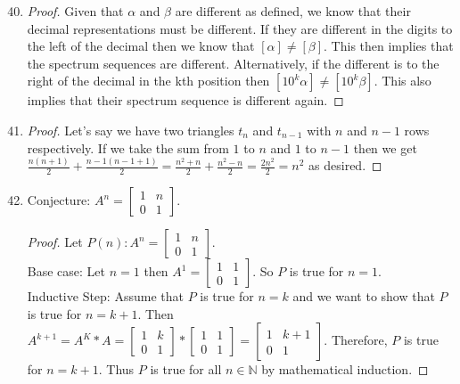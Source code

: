 \documentclass{article}
\begin{document}
\begin{enumerate}
    \setcounter{enumi}{39}
    \item
    
    \begin{proof}
    Given that $\alpha$ and $\beta$ are different as defined, we know that their decimal representations must be different. If they are different in the digits to the left of the decimal then we know that $[\alpha]\neq[\beta]$. This then implies that the spectrum sequences are different. Alternatively, if the different is to the right of the decimal in the kth position then $[10^k\alpha]\neq[10^k\beta]$. This also implies that their spectrum sequence is different again.
    \end{proof}
    
    \setcounter{enumi}{5}
    \item
    
    \begin{proof}
    Let's say we have two triangles $t_n$ and $t_{n-1}$ with $n$ and $n-1$ rows respectively. If we take the sum from $1$ to $n$ and $1$ to $n-1$ then we get $\frac{n(n+1)}{2} + \frac{n-1(n-1+1)}{2} = \frac{n^2+n}{2} + \frac{n^2-n}{2} = \frac{2n^2}{2} = n^2$ as desired.
    \end{proof}
    
    \setcounter{enumi}{4}
    \item
    
    Conjecture: $A^n = \begin{bmatrix}
    1 & n \\
    0 & 1
    \end{bmatrix}$.
    \begin{proof}
    Let $P(n): A^n = \begin{bmatrix}
    1 & n \\
    0 & 1
    \end{bmatrix}.$\\
    Base case: Let $n=1$ then $A^1 = \begin{bmatrix}
    1 &  1\\
    0 & 1
    \end{bmatrix}$. So $P$ is true for $n=1.$\\
    Inductive Step: Assume that $P$ is true for $n=k$ and we want to show that $P$ is true for $n=k+1.$ Then $A^{k+1} = A^K *A = \begin{bmatrix}
    1 &  k\\
    0 & 1
    \end{bmatrix} * \begin{bmatrix}
    1 &  1\\
    0 & 1
    \end{bmatrix} = \begin{bmatrix}
    1 &  k+1\\
    0 & 1
    \end{bmatrix}$. Therefore, $P$ is true for $n=k+1$. Thus $P$ is true for all $n\in \mathbb{N}$ by mathematical induction.
    \end{proof}
    

\end{enumerate}
\end{document}
